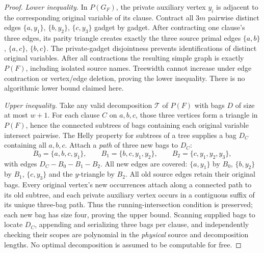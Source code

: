 \documentclass[11pt]{article}
\begin{document}
\begin{proof}
\emph{Lower inequality.} In $P(G_F)$, the private auxiliary vertex $y_i$ is adjacent to the corresponding original variable of its clause. Contract all $3m$ pairwise distinct edges $\{a,y_1\}$, $\{b,y_2\}$, $\{c,y_3\}$ gadget by gadget. After contracting one clause's three edges, its parity triangle creates exactly the three source primal edges $\{a,b\}$, $\{a,c\}$, $\{b,c\}$. The private-gadget disjointness prevents identifications of distinct original variables. After all contractions the resulting simple graph is exactly $P(F)$, including isolated source names. Treewidth cannot increase under edge contraction or vertex/edge deletion, proving the lower inequality. There is no algorithmic lower bound claimed here.

\emph{Upper inequality.} Take any valid decomposition $\mathcal T$ of $P(F)$ with bags $D$ of size at most $w+1$. For each clause $C$ on $a,b,c$, those three vertices form a triangle in $P(F)$, hence the connected subtrees of bags containing each original variable intersect pairwise. The Helly property for subtrees of a tree supplies a bag $D_C$ containing all $a,b,c$. Attach a \emph{path} of three new bags to $D_C$:
\[
 B_0=\{a,b,c,y_1\},\qquad
 B_1=\{b,c,y_1,y_2\},\qquad
 B_2=\{c,y_1,y_2,y_3\},
\]
with edges $D_C-B_0-B_1-B_2$. All new edges are covered: $\{a,y_1\}$ by $B_0$, $\{b,y_2\}$ by $B_1$, $\{c,y_3\}$ and the $y$-triangle by $B_2$. All old source edges retain their original bags. Every original vertex's new occurrences attach along a connected path to its old subtree, and each private auxiliary vertex occurs in a contiguous suffix of its unique three-bag path. Thus the running-intersection condition is preserved; each new bag has size four, proving the upper bound. Scanning supplied bags to locate $D_C$, appending and serializing three bags per clause, and independently checking their scopes are polynomial in the \emph{physical} source and decomposition lengths. No optimal decomposition is assumed to be computable for free.\end{proof}
\end{document}

